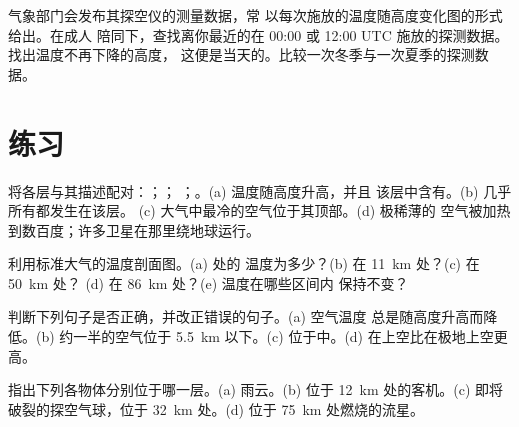 \begin{inthefield}[跟踪探空气球]
气象部门会发布其探空仪的测量数据，常
以每次施放的温度随高度变化图的形式给出。在成人
陪同下，查找离你最近的在 00:00 或
12:00 UTC 施放的探测数据。找出温度不再下降的高度，
这便是当天的。比较一次冬季与一次夏季的探测数据。
\end{inthefield}

\section{练习}

\begin{exercise}[$\star$]\label{exo:g8:the-atmosphere:1}
将各层与其描述配对：；；
；。(a) 温度随高度升高，并且
该层中含有。(b) 几乎所有都发生在该层。
(c) 大气中最冷的空气位于其顶部。(d) 极稀薄的
空气被加热到数百度；许多卫星在那里绕地球运行。
\end{exercise}

\begin{exercise}[$\star$]\label{exo:g8:the-atmosphere:2}
利用标准大气的温度剖面图。(a) 处的
温度为多少？(b) 在 \qty{11}{km} 处？(c) 在 \qty{50}{km} 处？
(d) 在 \qty{86}{km} 处？(e) 温度在哪些区间内
保持不变？
\end{exercise}

\begin{exercise}[$\star$]\label{exo:g8:the-atmosphere:3}
判断下列句子是否正确，并改正错误的句子。(a) 空气温度
总是随高度升高而降低。(b) 约一半的空气位于
\qty{5.5}{km} 以下。(c) 位于中。(d) 
在上空比在极地上空更高。
\end{exercise}

\begin{exercise}[$\star$]\label{exo:g8:the-atmosphere:4}
指出下列各物体分别位于哪一层。(a) 雨云。(b) 位于
\qty{12}{km} 处的客机。(c) 即将破裂的探空气球，位于
\qty{32}{km} 处。(d) 位于 \qty{75}{km} 处燃烧的流星。
\end{exercise}

